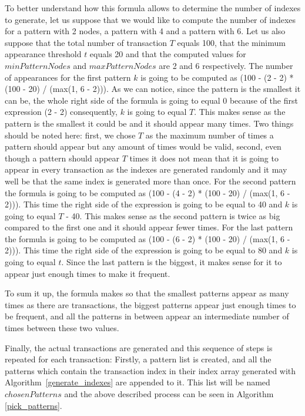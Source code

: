 \documentclass{acm_proc_article-sp-sigmod09}
\begin{document}
To better understand how this formula allows to determine the number of indexes to generate, let us suppose that we would like to compute the number of indexes for a pattern with 2 nodes, a pattern with 4 and a pattern with 6. Let us also suppose that the total number of transaction $T$ equals 100, that the minimum appearance threshold $t$ equals 20 and that the computed values for $minPatternNodes$ and $maxPatternNodes$ are 2 and 6 respectively. The number of appearances for the first pattern $k$ is going to be computed as (100 - (2 - 2) * (100 - 20) / (max(1, 6 - 2))). As we can notice, since the pattern is the smallest it can be, the whole right side of the formula is going to equal 0 because of the first expression (2 - 2) consequently, $k$ is going to equal $T$. This makes sense as the pattern is the smallest it could be and it should appear many times. Two things should be noted here: first, we chose $T$ as the maximum number of times a pattern should appear but any amount of times would be valid, second, even though a pattern should appear $T$ times it does not mean that it is going to appear in every transaction as the indexes are generated randomly and it may well be that the same index is generated more than once. For the second pattern the formula is going to be computed as (100 - (4 - 2) * (100 - 20) / (max(1, 6 - 2))). This time the right side of the expression is going to be equal to 40 and $k$ is going to equal $T$ - 40. This makes sense as the second pattern is twice as big compared to the first one and it should appear fewer times. For the last pattern the formula is going to be computed as (100 - (6 - 2) * (100 - 20) / (max(1, 6 - 2))). This time the right side of the expression is going to be equal to 80 and $k$ is going to equal $t$. Since the last pattern is the biggest, it makes sense for it to appear just enough times to make it frequent.

To sum it up, the formula makes so that the smallest patterns appear as many times as there are transactions, the biggest patterns appear just enough times to be frequent, and all the patterns in between appear an intermediate number of times between these two values.

Finally, the actual transactions are generated and this sequence of steps is repeated for each transaction: Firstly, a pattern list is created, and all the patterns which contain the transaction index in their index array generated with Algorithm~\ref{generate_indexes} are appended to it. This list will be named $chosenPatterns$ and the above described process can be seen in Algorithm \ref{pick_patterns}.
\end{document}
